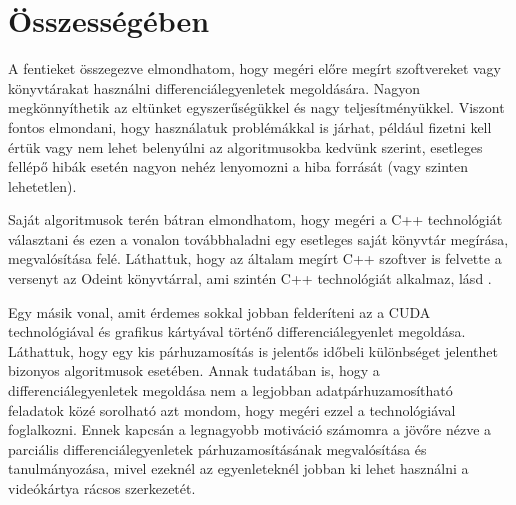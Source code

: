 \section {Összességében}

A fentieket összegezve elmondhatom, hogy megéri előre megírt szoftvereket vagy könyvtárakat használni differenciálegyenletek megoldására. Nagyon megkönnyíthetik az eltünket egyszerűségükkel és nagy teljesítményükkel. Viszont fontos elmondani, hogy használatuk problémákkal is járhat, például fizetni kell értük vagy nem lehet belenyúlni az algoritmusokba kedvünk szerint, esetleges fellépő hibák esetén nagyon nehéz lenyomozni a hiba forrását (vagy szinten lehetetlen).

Saját algoritmusok terén bátran elmondhatom, hogy megéri a C++ technológiát választani és ezen a vonalon továbbhaladni egy esetleges saját könyvtár megírása, megvalósítása felé. Láthattuk, hogy az általam megírt C++ szoftver is felvette a versenyt az Odeint könyvtárral, ami szintén C++ technológiát alkalmaz, l\'asd \cite{Antal}.

Egy másik vonal, amit érdemes sokkal jobban felderíteni az a CUDA technológiával és grafikus kártyával történő differenciálegyenlet megoldása. Láthattuk, hogy egy kis párhuzamosítás is jelentős időbeli különbséget jelenthet bizonyos algoritmusok esetében. Annak tudatában is, hogy a differenciálegyenletek megoldása nem a legjobban adatpárhuzamosítható feladatok közé sorolható azt mondom, hogy megéri ezzel a technológiával foglalkozni. Ennek kapcsán a legnagyobb motiváció számomra a jövőre nézve a parciális differenciálegyenletek párhuzamosításának megvalósítása és tanulmányozása, mivel ezeknél az egyenleteknél jobban ki lehet használni a videókártya rácsos szerkezetét.